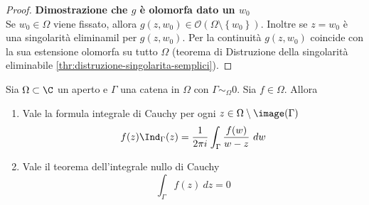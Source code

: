 \begin{proof}
   \textbf{Dimostrazione che $g$ è olomorfa dato un $w_0$} \\

   Se $w_0 \in \Omega$ viene fissato, allora $g(z, w_0) \in
   \mathcal{O}(\Omega\setminus\left\{ w_0 \right\})$. Inoltre se $z = w_0$
   è una singolarità eliminamil per $g(z,w_0)$. Per la continuità $g(z,w_0)$
   coincide con la sua estensione olomorfa su tutto $\Omega$ (teorema di
     Distruzione della singolarità eliminabile
   \ref{thr:distruzione-singolarita-semplici}).
 \end{proof}

\begin{theorem}
Sia $\Omega \subset \C$ un aperto e $\Gamma$ una catena in $\Omega$ con
$\Gamma \sim_\Omega 0$. Sia $f \in \mathcal{\Omega}$. Allora 
\begin{enumerate}
    \item Vale la formula integrale di Cauchy per ogni $z \in \Omega \setminus
        \image(\Gamma)$  
        \begin{equation*}
            f(z) \Ind_\Gamma(z) = \frac{1}{2\pi i} \int_\Gamma
            \frac{f(w)}{w-z}\ dw
        \end{equation*}
    \item Vale il teorema dell'integrale nullo di Cauchy 
        \begin{equation*}
            \int_\Gamma f(z) \ dz = 0
        \end{equation*}
\end{enumerate}
\label{thr:formule-di-cauchy-generale}
\end{theorem}
